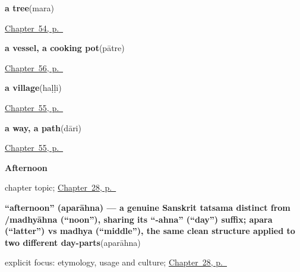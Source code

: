 \noindent\begin{minipage}[t]{\linewidth}
\raggedright
\textbf{a tree}\enspace\emph{}\enspace(mara)\par
\footnotesize \hyperref[ch:ka-tree]{Chapter~54, p.~\pageref*{ch:ka-tree}}
\end{minipage}\par\smallskip

\noindent\begin{minipage}[t]{\linewidth}
\raggedright
\textbf{a vessel, a cooking pot}\enspace\emph{}\enspace(pātre)\par
\footnotesize \hyperref[ch:ka-house]{Chapter~56, p.~\pageref*{ch:ka-house}}
\end{minipage}\par\smallskip

\noindent\begin{minipage}[t]{\linewidth}
\raggedright
\textbf{a village}\enspace\emph{}\enspace(haḷḷi)\par
\footnotesize \hyperref[ch:ka-river-road]{Chapter~55, p.~\pageref*{ch:ka-river-road}}
\end{minipage}\par\smallskip

\noindent\begin{minipage}[t]{\linewidth}
\raggedright
\textbf{a way, a path}\enspace\emph{}\enspace(dāri)\par
\footnotesize \hyperref[ch:ka-river-road]{Chapter~55, p.~\pageref*{ch:ka-river-road}}
\end{minipage}\par\smallskip

\noindent\begin{minipage}[t]{\linewidth}
\raggedright
\textbf{Afternoon}\par
\footnotesize chapter topic; \hyperref[ch:ka-afternoon]{Chapter~28, p.~\pageref*{ch:ka-afternoon}}
\end{minipage}\par\smallskip

\noindent\begin{minipage}[t]{\linewidth}
\raggedright
\textbf{\textquotedblleft{}afternoon\textquotedblright{} (aparāhna) — a genuine Sanskrit tatsama distinct from /madhyāhna (\textquotedblleft{}noon\textquotedblright{}), sharing its \textquotedblleft{}-ahna\textquotedblright{} (\textquotedblleft{}day\textquotedblright{}) suffix; apara (\textquotedblleft{}latter\textquotedblright{}) vs madhya (\textquotedblleft{}middle\textquotedblright{}), the same clean structure applied to two different day-parts}\enspace\emph{}\enspace(aparāhna)\par
\footnotesize explicit focus: etymology, usage and culture; \hyperref[ch:ka-afternoon]{Chapter~28, p.~\pageref*{ch:ka-afternoon}}
\end{minipage}\par\smallskip

